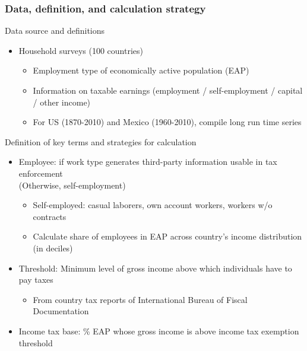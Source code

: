 \documentclass[aspectratio=169]{beamer}
\begin{document}
\begin{frame}
\frametitle{Data, definition, and calculation strategy} 
Data source and definitions
\begin{itemize}\setlength\itemsep{3pt}
\item Household surveys (100 countries)
\begin{itemize}\setlength\itemsep{3pt}
\item Employment type of economically active population (EAP)
\item Information on taxable earnings (employment / self-employment / capital / other income)
\item For US (1870-2010) and Mexico (1960-2010), compile long run time series 
\end{itemize}
\end{itemize}\medskip
Definition of key terms and strategies for calculation
\begin{itemize}\setlength\itemsep{3pt}
\item Employee: if work type generates third-party information usable in tax enforcement \\ (Otherwise, self-employment)
\begin{itemize}\setlength\itemsep{3pt}
\item Self-employed: casual laborers, own account workers, workers w/o contracts
\item Calculate share of employees in EAP across country's income distribution (in deciles)
\end{itemize}
\item Threshold: Minimum level of gross income above which individuals have to pay taxes
\begin{itemize}\setlength\itemsep{3pt}
\item From country tax reports of International Bureau of Fiscal Documentation
\end{itemize}
\item Income tax base: \% EAP whose gross income is above income tax exemption threshold

\end{itemize}
\end{frame}
\end{document}
